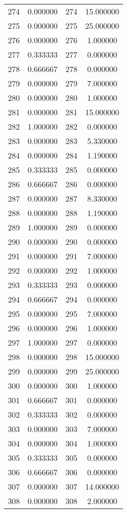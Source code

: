 \documentclass[12pt]{article}
\begin{document}
\begin{longtable}{@{}cccc@{}}
274 & 0.000000 & 274 & 15.000000 \\
275 & 0.000000 & 275 & 25.000000 \\
276 & 0.000000 & 276 & 1.000000 \\
277 & 0.333333 & 277 & 0.000000 \\
278 & 0.666667 & 278 & 0.000000 \\
279 & 0.000000 & 279 & 7.000000 \\
280 & 0.000000 & 280 & 1.000000 \\
281 & 0.000000 & 281 & 15.000000 \\
282 & 1.000000 & 282 & 0.000000 \\
283 & 0.000000 & 283 & 5.330000 \\
284 & 0.000000 & 284 & 1.190000 \\
285 & 0.333333 & 285 & 0.000000 \\
286 & 0.666667 & 286 & 0.000000 \\
287 & 0.000000 & 287 & 8.330000 \\
288 & 0.000000 & 288 & 1.190000 \\
289 & 1.000000 & 289 & 0.000000 \\
290 & 0.000000 & 290 & 0.000000 \\
291 & 0.000000 & 291 & 7.000000 \\
292 & 0.000000 & 292 & 1.000000 \\
293 & 0.333333 & 293 & 0.000000 \\
294 & 0.666667 & 294 & 0.000000 \\
295 & 0.000000 & 295 & 7.000000 \\
296 & 0.000000 & 296 & 1.000000 \\
297 & 1.000000 & 297 & 0.000000 \\
298 & 0.000000 & 298 & 15.000000 \\
299 & 0.000000 & 299 & 25.000000 \\
300 & 0.000000 & 300 & 1.000000 \\
301 & 0.666667 & 301 & 0.000000 \\
302 & 0.333333 & 302 & 0.000000 \\
303 & 0.000000 & 303 & 7.000000 \\
304 & 0.000000 & 304 & 1.000000 \\
305 & 0.333333 & 305 & 0.000000 \\
306 & 0.666667 & 306 & 0.000000 \\
307 & 0.000000 & 307 & 14.000000 \\
308 & 0.000000 & 308 & 2.000000 \\

\end{longtable}
\end{document}

